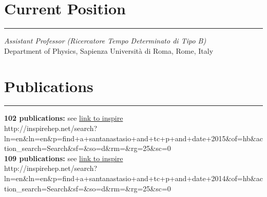 \documentclass[10pt, a4paper]{article}
\newcommand{\years}[1]{\marginnote{\hskip-0.2in{\small #1}}}
\begin{document}
\section*{Current Position}
\vspace{-5pt}
\hrule
\vspace{10pt}
\emph{Assistant Professor (Ricercatore Tempo Determinato di Tipo B)} \\
Department of Physics, Sapienza Universit\`a di Roma, Rome, Italy


\section*{Publications}
\vspace{-5pt}
\hrule
\vspace{10pt}
\years{2015}\textbf{102 publications:} see
\href{http://inspirehep.net/search?ln=en&ln=en&p=find+a+santanastasio+and+tc+p+and+date+2015&of=hb&action_search=Search&sf=&so=d&rm=&rg=25&sc=0}{link
  to inspire}\\
{\tiny
  http://inspirehep.net/search?ln=en\&ln=en\&p=find+a+santanastasio+and+tc+p+and+date+2015\&of=hb\&action\_search=Search\&sf=\&so=d\&rm=\&rg=25\&sc=0}\\[1em]\normalsize
\years{2014}\textbf{109 publications:} see
\href{http://inspirehep.net/search?ln=en&ln=en&p=find+a+santanastasio+and+tc+p+and+date+2014&of=hb&action_search=Search&sf=&so=d&rm=&rg=25&sc=0}{link
  to inspire}\\
{\tiny
  http://inspirehep.net/search?ln=en\&ln=en\&p=find+a+santanastasio+and+tc+p+and+date+2014\&of=hb\&action\_search=Search\&sf=\&so=d\&rm=\&rg=25\&sc=0}\normalsize
\end{document}
